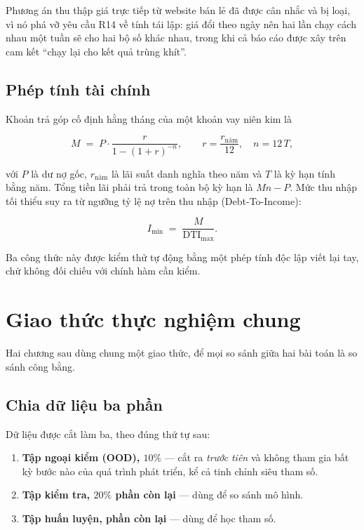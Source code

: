 Phương án thu thập giá trực tiếp từ website bán lẻ đã được cân nhắc và bị loại,
vì nó phá vỡ yêu cầu R14 về tính tái lập: giá đổi theo ngày nên hai lần chạy
cách nhau một tuần sẽ cho hai bộ số khác nhau, trong khi cả báo cáo được xây
trên cam kết ``chạy lại cho kết quả trùng khít''.

\subsection{Phép tính tài chính}
\label{sec:cong-thuc-nien-kim}

Khoản trả góp cố định hằng tháng của một khoản vay niên kim là

\begin{equation}
M \;=\; P \cdot \frac{r}{1-(1+r)^{-n}},
\qquad r=\frac{r_{\text{năm}}}{12},\quad n = 12\,T,
\label{eq:nienkim}
\end{equation}

\noindent với $P$ là dư nợ gốc, $r_{\text{năm}}$ là lãi suất danh nghĩa theo
năm và $T$ là kỳ hạn tính bằng năm. Tổng tiền lãi phải trả trong toàn bộ kỳ hạn
là $Mn - P$. Mức thu nhập tối thiểu suy ra từ ngưỡng tỷ lệ nợ trên thu nhập
(Debt-To-Income):

\begin{equation}
I_{\min} \;=\; \frac{M}{\text{DTI}_{\max}}.
\label{eq:dti}
\end{equation}

Ba công thức này được kiểm thử tự động bằng một phép tính độc lập viết lại tay,
chứ không đối chiếu với chính hàm cần kiểm.

\section{Giao thức thực nghiệm chung}
\label{sec:giaothuc}

Hai chương sau dùng chung một giao thức, để mọi so sánh giữa hai bài toán là so
sánh công bằng.

\subsection{Chia dữ liệu ba phần}

Dữ liệu được cắt làm ba, theo đúng thứ tự sau:

\begin{enumerate}
  \item \textbf{Tập ngoại kiểm (OOD), $10\%$} --- cắt ra \emph{trước tiên} và
        không tham gia bất kỳ bước nào của quá trình phát triển, kể cả tinh
        chỉnh siêu tham số.
  \item \textbf{Tập kiểm tra, $20\%$ phần còn lại} --- dùng để so sánh mô hình.
  \item \textbf{Tập huấn luyện, phần còn lại} --- dùng để học tham số.
\end{enumerate}

